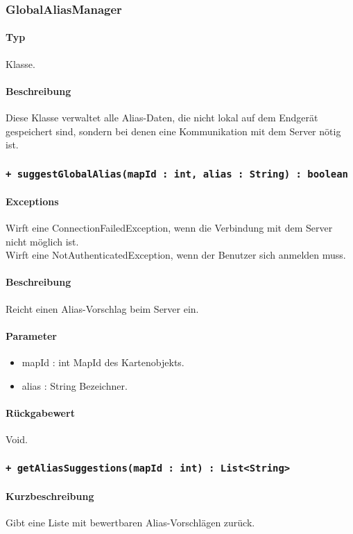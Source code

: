 \subsubsection{GlobalAliasManager}
\paragraph*{Typ}
Klasse.
\paragraph*{Beschreibung}
Diese Klasse verwaltet alle Alias-Daten, die nicht lokal auf dem Endgerät gespeichert sind, 
sondern bei denen eine Kommunikation mit dem Server nötig ist.

\subsubsection*{\texttt{+ suggestGlobalAlias(mapId : int, alias : String) : boolean}}%
\paragraph*{Exceptions}
Wirft eine ConnectionFailedException, wenn die Verbindung mit dem Server nicht möglich ist.\\
Wirft eine NotAuthenticatedException, wenn der Benutzer sich anmelden muss.
\paragraph*{Beschreibung}
Reicht einen Alias-Vorschlag beim Server ein.
\paragraph*{Parameter}
\begin{itemize}
    \item mapId : int MapId des Kartenobjekts.
    \item alias : String Bezeichner.
\end{itemize}
\paragraph*{Rückgabewert}
Void.

\subsubsection*{\texttt{+ getAliasSuggestions(mapId : int) : List<String>}}%
\paragraph*{Kurzbeschreibung}
Gibt eine Liste mit bewertbaren Alias-Vorschlägen zurück.
